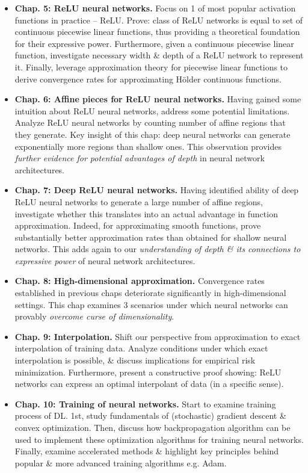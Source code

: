 \documentclass{article}
\begin{document}
\begin{itemize}
\begin{itemize}
\begin{itemize}
			\item {\bf Chap. 5: ReLU neural networks.} Focus on 1 of most popular activation functions in practice -- ReLU. Prove: class of ReLU networks is equal to set of continuous piecewise linear functions, thus providing a theoretical foundation for their expressive power. Furthermore, given a continuous piecewise linear function, investigate necessary width \& depth of a ReLU network to represent it. Finally, leverage approximation theory for piecewise linear functions to derive convergence rates for approximating H\"older continuous functions.
			\item {\bf Chap. 6: Affine pieces for ReLU neural networks.} Having gained some intuition about ReLU neural networks, address some potential limitations. Analyze ReLU neural networks by counting number of affine regions that they generate. Key insight of this chap: deep neural networks can generate exponentially more regions than shallow ones. This observation provides {\it further evidence for potential advantages of depth} in neural network architectures.
			\item {\bf Chap. 7: Deep ReLU neural networks.} Having identified ability of deep ReLU neural networks to generate a large number of affine regions, investigate whether this translates into an actual advantage in function approximation. Indeed, for approximating smooth functions, prove substantially better approximation rates than obtained for shallow neural networks. This adds again to our {\it understanding of depth \& its connections to expressive power} of neural network architectures.
			\item {\bf Chap. 8: High-dimensional approximation.} Convergence rates established in previous chaps deteriorate significantly in high-dimensional settings. This chap examines 3 scenarios under which neural networks can provably {\it overcome curse of dimensionality}.
			\item {\bf Chap. 9: Interpolation.} Shift our perspective from approximation to exact interpolation of training data. Analyze conditions under which exact interpolation is possible, \& discuss implications for empirical risk minimization. Furthermore, present a constructive proof showing: ReLU networks can express an optimal interpolant of data (in a specific sense).
			\item {\bf Chap. 10: Training of neural networks.} Start to examine training process of DL. 1st, study fundamentals of (stochastic) gradient descent \& convex optimization. Then, discuss how backpropagation algorithm can be used to implement these optimization algorithms for training neural networks. Finally, examine accelerated methods \& highlight key principles behind popular \& more advanced training algorithms e.g. Adam.

\end{itemize}
\end{itemize}
\end{itemize}
\end{document}
